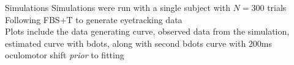 \documentclass{beamer}
\newcommand{\code}[1]{\texttt{#1}}
\begin{document}
%
%
%
%
%

\begin{frame}{Simulations}
Simulations were run with a single subject with $N = 300$ trials \newline \\

Following FBS+T to generate eyetracking data \newline \\

Plots include the data generating curve, observed data from the simulation, estimated curve with bdots, along with second bdots curve with 200ms oculomotor shift \textit{prior} to fitting

\end{frame}
\end{document}

